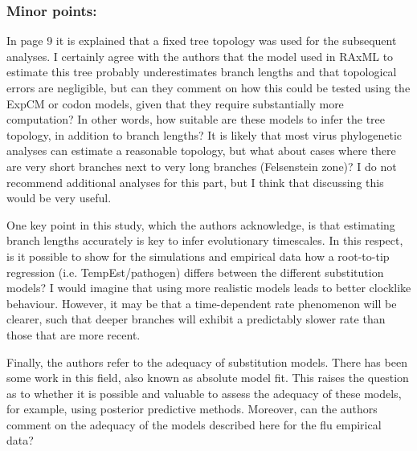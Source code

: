 \documentclass[11pt, oneside]{article}   	%
\newcommand{\response}[1]{{\color{black}#1}}
\begin{document}
\subsubsection*{Minor points:} 

In page 9 it is explained that a fixed tree topology was used for the subsequent analyses. 
I certainly agree with the authors that the model used in RAxML to estimate this tree probably underestimates branch lengths and that topological errors are negligible, but can they comment on how this could be tested using the ExpCM or codon models, given that they require substantially more computation? 
In other words, how suitable are these models to infer the tree topology, in addition to branch lengths? 
It is likely that most virus phylogenetic analyses can estimate a reasonable topology, but what about cases where there are very short branches next to very long branches (Felsenstein zone)? 
I do not recommend additional analyses for this part, but I think that discussing this would be very useful. 
\response{} 

One key point in this study, which the authors acknowledge, is that estimating branch lengths accurately is key to infer evolutionary timescales. 
In this respect, is it possible to show for the simulations and empirical data how a root-to-tip regression (i.e. TempEst/pathogen) differs between the different substitution models? 
I would imagine that using more realistic models leads to better clocklike behaviour. 
However, it may be that a time-dependent rate phenomenon will be clearer, such that deeper branches will exhibit a predictably slower rate than those that are more recent. 
\response{}

Finally, the authors refer to the adequacy of substitution models. 
There has been some work in this field, also known as absolute model fit. 
This raises the question as to whether it is possible and valuable to assess the adequacy of these models, for example, using posterior predictive methods. 
Moreover, can the authors comment on the adequacy of the models described here for the flu empirical data? 
\response{}
\end{document}
